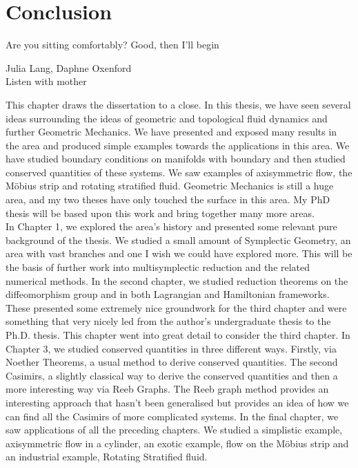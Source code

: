 
\chapter{Conclusion}
\epigraph{Are you sitting comfortably? Good, then I'll begin}{Julia Lang, Daphne Oxenford \\ Listen with mother}

\noindent
This chapter draws the dissertation to a close. In this thesis, we have seen several ideas surrounding the ideas of geometric and topological fluid dynamics and further Geometric Mechanics. We have presented and exposed many results in the area and produced simple examples towards the applications in this area. We have studied boundary conditions on manifolds with boundary and then studied conserved quantities of these systems. We saw examples of axisymmetric flow, the M\"obius strip and rotating stratified fluid. Geometric Mechanics is still a huge area, and my two theses have only touched the surface in this area. My PhD thesis will be based upon this work and bring together many more areas.\\

\noindent
In Chapter 1, we explored the area's history and presented some relevant pure background of the thesis. We studied a small amount of Symplectic Geometry, an area with vast branches and one I wish we could have explored more. This will be the basis of further work into multisymplectic reduction and the related numerical methods. In the second chapter, we studied reduction theorems on the diffeomorphism group and in both Lagrangian and Hamiltonian frameworks. These presented some extremely nice groundwork for the third chapter and were something that very nicely led from the author's undergraduate thesis to the Ph.D. thesis. This chapter went into great detail to consider the third chapter. In Chapter 3, we studied conserved quantities in three different ways. Firstly, via Noether Theorems, a usual method to derive conserved quantities. The second Casimirs, a slightly classical way to derive the conserved quantities and then a more interesting way via Reeb Graphs. The Reeb graph method provides an interesting approach that hasn't been generalised but provides an idea of how we can find all the Casimirs of more complicated systems. In the final chapter, we saw applications of all the preceding chapters. We studied a simplistic example, axisymmetric flow in a cylinder, an exotic example, flow on the M\"obius strip and an industrial example, Rotating Stratified fluid. \\

